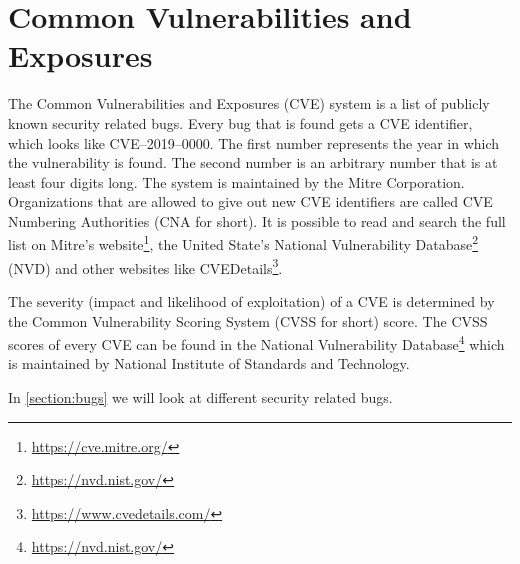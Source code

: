 \section{Common Vulnerabilities and Exposures}
The Common Vulnerabilities and Exposures (CVE) system is a list of publicly known security related bugs. Every bug that is found gets a CVE identifier, which looks like CVE--2019--0000. The first number represents the year in which the vulnerability is found. The second number is an arbitrary number that is at least four digits long. The system is maintained by the Mitre Corporation. Organizations that are allowed to give out new CVE identifiers are called CVE Numbering Authorities (CNA for short). It is possible to read and search the full list on Mitre's website\footnote{\url{https://cve.mitre.org/}}, the United State's National Vulnerability Database\footnote{\url{https://nvd.nist.gov/}} (NVD) and other websites like CVEDetails\footnote{\url{https://www.cvedetails.com/}}.

\medskip

The severity (impact and likelihood of exploitation) of a CVE is determined by the Common Vulnerability Scoring System (CVSS for short) score. The CVSS scores of every CVE can be found in the National Vulnerability Database\footnote{\url{https://nvd.nist.gov/}} which is maintained by National Institute of Standards and Technology.

\medskip

In \autoref{section:bugs} we will look at different security related bugs.

